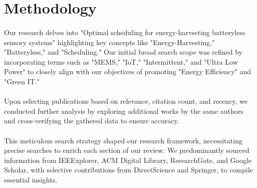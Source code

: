 \appendix
\section{Methodology}
    
    \paragraph{}
    Our research delves into "Optimal scheduling for energy-harvesting batteryless sensory systems" highlighting key concepts like "Energy-Harvesting," "Batteryless," and "Scheduling." Our initial broad search scope was refined by incorporating terms such as "MEMS," "IoT," "Intermittent," and "Ultra Low Power" to closely align with our objectives of promoting "Energy Efficiency" and "Green IT."

    \paragraph{}
    Upon selecting publications based on relevance, citation count, and recency, we conducted further analysis by exploring additional works by the same authors and cross-verifying the gathered data to ensure accuracy.

    \paragraph{}
    This meticulous search strategy shaped our research framework, necessitating precise searches to enrich each section of our review. We predominantly sourced information from IEEExplorer, ACM Digital Library, ResearchGate, and Google Scholar, with selective contributions from DirectScience and Springer, to compile essential insights.
